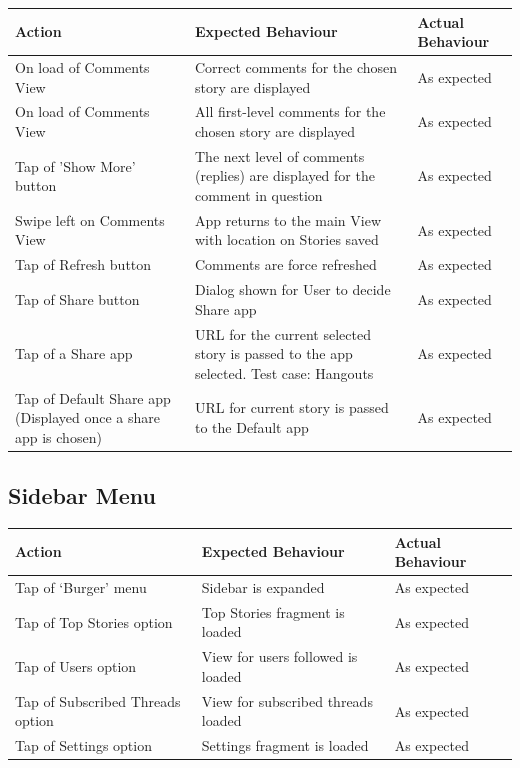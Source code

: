 \documentclass[11pt]{article}
\begin{document}
\begin{center}
\begin{tabular}{ | p{5cm} | p{5cm} | p{5cm} |}
	\hline
	\textbf{Action} & \textbf{Expected Behaviour} & \textbf{Actual Behaviour} \\
	\hline
	On load of Comments View & Correct comments for the chosen story are displayed & As expected \\
	\hline
	On load of Comments View & All first-level comments for the chosen story are displayed & As expected \\
	\hline
	Tap of 'Show More' button & The next level of comments (replies) are displayed for the comment in question & As expected \\
	\hline
	Swipe left on Comments View & App returns to the main View with location on Stories saved & As expected \\
	\hline
	Tap of Refresh button & Comments are force refreshed & As expected \\
	\hline
	Tap of Share button & Dialog shown for User to decide Share app & As expected \\
	\hline
	Tap of a Share app & URL for the current selected story is passed to the app selected. Test case: Hangouts & As expected \\
	\hline
	Tap of Default Share app (Displayed once a share app is chosen) & URL for current story is passed to the Default app & As expected \\
	\hline
\end{tabular}
\end{center}

\subsection*{Sidebar Menu}
\begin{center}
\begin{tabular}{ | p{5cm} | p{5cm} | p{5cm} |}
	\hline
	\textbf{Action} & \textbf{Expected Behaviour} & \textbf{Actual Behaviour} \\
	\hline
	Tap of ‘Burger' menu & Sidebar is expanded & As expected \\
	\hline
	Tap of Top Stories option & Top Stories fragment is loaded & As expected \\
	\hline
	Tap of Users option & View for users followed is loaded & As expected \\
	\hline
	Tap of Subscribed Threads option & View for subscribed threads loaded & As expected \\
	\hline
	Tap of Settings option & Settings fragment is loaded & As expected \\
	\hline
\end{tabular}
\end{center}
\end{document}
